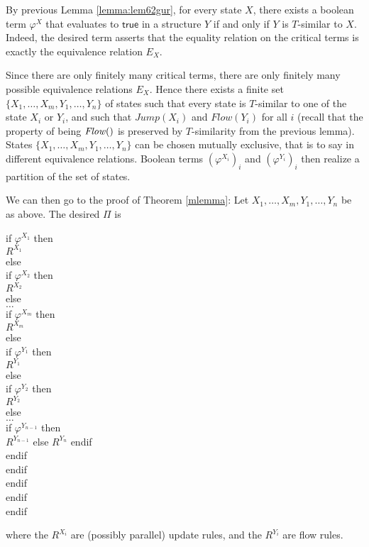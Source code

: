 \documentclass[envcountsame]{llncs}
\newcommand{\Continuous}[1]{\mathit{Flow}(#1)}   \newcommand{\notContinuous}[1]{\mathit{Jump}(#1)}   \newcommand{\Machine}{\textsc{Dynamic}}
\newcommand{\True}{\textsf{true}}
\newcommand\s{\phantom{x}}
\begin{document}
By previous Lemma \ref{lemma:lem62gur}, for every state $X$, there exists a boolean term $\varphi^X$ that
evaluates to $\True$ in a structure $Y$ if and only if $Y$ is
$T$-similar to $X$. Indeed, the desired term asserts that the equality
relation on the critical terms is exactly the equivalence relation
$E_X$.

Since there are only finitely many critical terms, there are
only finitely many possible equivalence relations $E_X$. Hence there
exists a finite set $\{X_1,\dots,X_m,Y_1,\dots,Y_n\}$ of states such that every
state is $T$-similar to one of the state $X_i$ or $Y_i$, and such that
 $\notContinuous{X_i}$ and $\Continuous{Y_i}$ for all $i$ (recall that the
property of being $\Continuous$ is preserved by $T$-similarity
from the previous lemma).  States  $\{X_1,\dots,X_m,Y_1,\dots,Y_n\}$ can
be chosen mutually exclusive, that is to say in different equivalence
relations. Boolean terms $(\varphi^{X_i})_i$ and $(\varphi^{Y_i})_i$  then realize a partition of the
set of states.

We can then go to the proof of Theorem \ref{mlemma}: 
Let $X_1,\dots,X_m, Y_1, \dots, Y_n$ be as above. The desired $\Pi$ is
\begin{center}
  \begin{minipage}{5cm}
\begin{ttfamily}
\noindent
   if $\varphi^{X_1}$ then\\  \s $R^{X_1}$\\  else \\
   \s if $\varphi^{X_2}$ then\\ \s\s  $R^{X_2}$ \\ \s else \\
\s\s\s\s  $\dots$ \\
\s\s\s\s    if $\varphi^{X_m}$ then \\
\s\s\s\s \s $R^{X_m}$ \\
\s\s\s\s  else \\
\s\s\s\s \s\s
   if $\varphi^{Y_1}$ then\\
\s\s\s\s \s\s\s $R^{Y_1}$ \\
\s\s\s\s  \s\s else \\
\s\s\s\s \s\s\s    if $\varphi^{Y_2}$ then \\
\s\s\s\s \s\s\s\s $R^{Y_2} $\\
\s\s\s\s \s\s\s  else  \\
\s\s\s\s \s\s\s\s\s\s\s  $\dots$ \\
\s\s\s\s \s\s\s\s \s\s\s   if $\varphi^{Y_{n-1}}$ then\\
\s\s\s\s \s\s\s\s \s\s\s\s  $R^{Y_{n-1}}$
\s\s\s\s \s\s\s\s \s\s\s else
\s\s\s\s \s\s\s\s \s\s\s\s  $R^{Y_{n}}$
\s\s\s\s \s\s\s\s \s\s\s endif \\
\s\s\s\s \s\s\s endif \\
\s\s\s\s  \s\s endif\\
\s\s\s\s endif\\
\s endif\\
endif
\end{ttfamily}
\end{minipage}
\end{center}
where the $R^{X_i}$ are (possibly parallel) update  rules, and the $R^{Y_i}$ are flow
rules.
\end{document}
